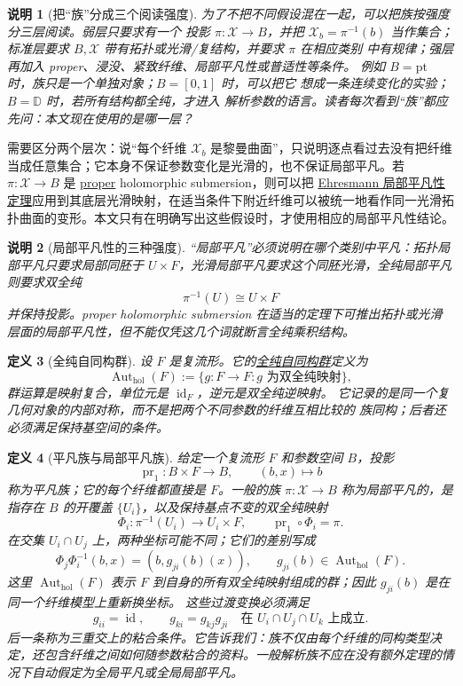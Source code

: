 \documentclass[UTF8,fontset=none,a4paper,11pt]{ctexart}
\theoremstyle{foundation-definition}
\newtheorem{definition}{定义}[section]
\theoremstyle{foundation-theorem}
\theoremstyle{foundation-proposition}
\theoremstyle{foundation-example}
\theoremstyle{foundation-remark}
\newtheorem{remark}[definition]{说明}
\theoremstyle{foundation-theorem}
\newcommand{\term}[2]{\hyperref[#1]{#2}}
\begin{document}
\begin{remark}[把“族”分成三个阅读强度]
为了不把不同假设混在一起，可以把族按强度分三层阅读。弱层只要求有一个
投影 \(\pi:\mathcal X\to B\)，并把 \(\mathcal X_b=\pi^{-1}(b)\) 当作集合；
标准层要求 \(B,\mathcal X\) 带有拓扑或光滑/复结构，并要求 \(\pi\) 在相应类别
中有规律；强层再加入 proper、浸没、紧致纤维、局部平凡性或普适性等条件。
例如 \(B=\mathrm{pt}\) 时，族只是一个单独对象；\(B=[0,1]\) 时，可以把它
想成一条连续变化的实验；\(B=\mathbb D\) 时，若所有结构都全纯，才进入
解析参数的语言。读者每次看到“族”都应先问：本文现在使用的是哪一层？
\end{remark}

需要区分两个层次：说“每个纤维 \(\mathcal X_b\) 是黎曼曲面”，只说明逐点看过去没有把纤维当成任意集合；它本身不保证参数变化是光滑的，也不保证局部平凡。若 \(\pi:\mathcal X\to B\) 是 \term{def:proper-map}{proper} holomorphic submersion，则可以把 \term{thm:ehresmann}{Ehresmann 局部平凡性定理}应用到其底层光滑映射，在适当条件下附近纤维可以被统一地看作同一光滑拓扑曲面的变形。本文只有在明确写出这些假设时，才使用相应的局部平凡性结论。

\begin{remark}[局部平凡性的三种强度]
“局部平凡”必须说明在哪个类别中平凡：拓扑局部平凡只要求局部同胚于
\(U\times F\)，光滑局部平凡要求这个同胚光滑，全纯局部平凡则要求双全纯
\[
\pi^{-1}(U)\cong U\times F
\]
并保持投影。proper holomorphic submersion 在适当的定理下可推出拓扑或光滑
层面的局部平凡性，但不能仅凭这几个词就断言全纯乘积结构。
\end{remark}

\begin{definition}[全纯自同构群]\label{def:holomorphic-automorphism-group}
设 \(F\) 是复流形。它的\term{def:holomorphic-automorphism-group}{全纯自同构群}定义为
\[
\operatorname{Aut}_{\mathrm{hol}}(F)
:=\{g:F\to F:g\text{ 为双全纯映射}\},
\]
群运算是映射复合，单位元是 \(\operatorname{id}_F\)，逆元是双全纯逆映射。
它记录的是同一个复几何对象的内部对称，而不是把两个不同参数的纤维互相比较的
族同构；后者还必须满足保持基空间的条件。
\end{definition}

\begin{definition}[平凡族与局部平凡族]\label{def:trivial-family}
给定一个复流形 \(F\) 和参数空间 \(B\)，投影
\[
\operatorname{pr}_1:B\times F\longrightarrow B,
\qquad (b,x)\longmapsto b
\]
称为平凡族；它的每个纤维都直接是 \(F\)。一般的族
\(\pi:\mathcal X\to B\) 称为局部平凡的，是指存在 \(B\) 的开覆盖
\(\{U_i\}\)，以及保持基点不变的双全纯映射
\[
\Phi_i:\pi^{-1}(U_i)\longrightarrow U_i\times F,
\qquad
\operatorname{pr}_1\circ\Phi_i=\pi.
\]
在交集 \(U_i\cap U_j\) 上，两种坐标可能不同；它们的差别写成
\[
\Phi_j\Phi_i^{-1}(b,x)=(b,g_{ji}(b)(x)),
\qquad g_{ji}(b)\in\operatorname{Aut}_{\mathrm{hol}}(F).
\]
这里 \(\operatorname{Aut}_{\mathrm{hol}}(F)\) 表示 \(F\) 到自身的所有双全纯映射组成的群；因此 \(g_{ji}(b)\) 是在同一个纤维模型上重新换坐标。
这些过渡变换必须满足
\[
g_{ii}=\operatorname{id},\qquad
g_{ki}=g_{kj}g_{ji}
\quad\text{在 }U_i\cap U_j\cap U_k\text{ 上成立}.
\]
后一条称为三重交上的粘合条件。它告诉我们：族不仅由每个纤维的同构类型决定，还包含纤维之间如何随参数粘合的资料。一般解析族不应在没有额外定理的情况下自动假定为全局平凡或全局局部平凡。
\end{definition}
\end{document}
